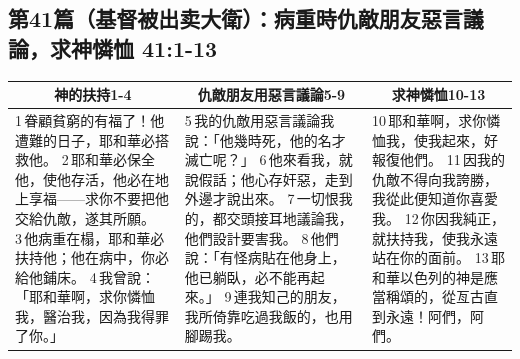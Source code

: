 \subsection{第41篇（基督被出卖大衛）：病重時仇敵朋友惡言議論，求神憐恤  41:1-13}
\begin{table}[H]
\centering
\begin{tabular}{p{5.75cm}|p{6.00cm}|p{5.00cm}}\hline\hline
\multicolumn{1}{c|}{神的扶持1-4}&\multicolumn{1}{c|}{仇敵朋友用惡言議論5-9}&\multicolumn{1}{c}{求神憐恤10-13}\\\hline
1 眷顧貧窮的有福了！他遭難的日子，耶和華必搭救他。
2 耶和華必保全他，使他存活，他必在地上享福——求你不要把他交給仇敵，遂其所願。
3 他病重在榻，耶和華必扶持他；他在病中，你必給他鋪床。
4 我曾說：「耶和華啊，求你憐恤我，醫治我，因為我得罪了你。」
&5 我的仇敵用惡言議論我說：「他幾時死，他的名才滅亡呢？」
6 他來看我，就說假話；他心存奸惡，走到外邊才說出來。
7 一切恨我的，都交頭接耳地議論我，他們設計要害我。
8 他們說：「有怪病貼在他身上，他已躺臥，必不能再起來。」
9 連我知己的朋友，我所倚靠吃過我飯的，也用腳踢我。
&10 耶和華啊，求你憐恤我，使我起來，好報復他們。
11 因我的仇敵不得向我誇勝，我從此便知道你喜愛我。
12 你因我純正，就扶持我，使我永遠站在你的面前。
13 耶和華以色列的神是應當稱頌的，從亙古直到永遠！阿們，阿們。\\\hline
\end{tabular}
\end{table} 


















